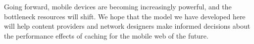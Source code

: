Going forward, mobile devices are becoming increasingly powerful, and the
bottleneck resources will shift. We hope that the model we have developed here
will help content providers and network designers make informed decisions about the performance
effects of caching for the mobile web of the future.



